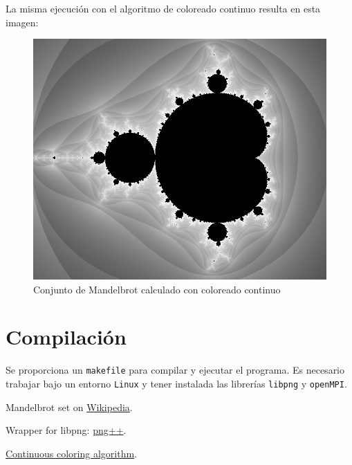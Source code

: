 \documentclass[11pt]{article}
\begin{document}
\newpage

La misma ejecución con el algoritmo de coloreado continuo resulta en esta imagen:\\

\begin{figure}[!ht]
    \centering
    \includegraphics[width=.65\textwidth]{img/0001-smooth-cropped}
	\caption{Conjunto de Mandelbrot calculado con coloreado continuo}
\end{figure}


\section*{Compilación}

Se proporciona un \verb|makefile| para compilar y ejecutar el programa. Es necesario trabajar bajo un entorno \verb|Linux| y tener instalada las librerías \verb|libpng| y \verb|openMPI|.

\begin{thebibliography}{9}

  Mandelbrot set on \href{https://en.wikipedia.org/wiki/Mandelbrot_set}{Wikipedia}.

  Wrapper for libpng: \href{http://www.nongnu.org/pngpp/doc/0.2.9/index.html}{png++}.

  \href{https://en.wikipedia.org/wiki/Mandelbrot_set#Continuous_(smooth)_coloring}{Continuous coloring algorithm}.

\end{thebibliography}
\end{document}
